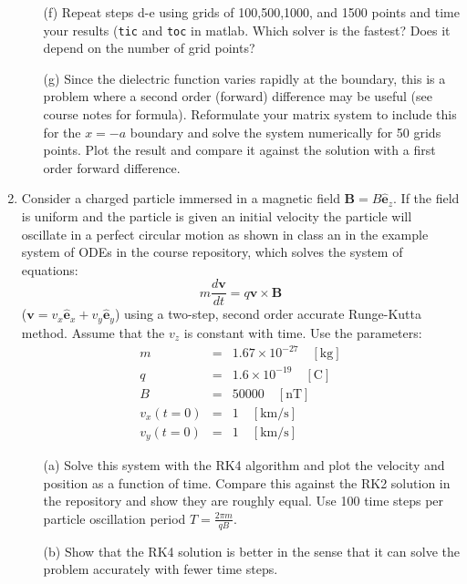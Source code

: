 \documentclass{article}
\begin{document}
\begin{enumerate}
\begin{itemize}
    \item[(f)]  Repeat steps d-e using grids of 100,500,1000, and 1500 points and time your results (\texttt{tic} and \texttt{toc} in matlab.  Which solver is the fastest?  Does it depend on the number of grid points?
    \item[(g)]  Since the dielectric function varies rapidly at the boundary, this is a problem where a second order (forward) difference may be useful (see course notes for formula).  Reformulate your matrix system to include this for the $x=-a$ boundary and solve the system numerically for 50 grids points.  Plot the result and compare it against the solution with a first order forward difference.  
  \end{itemize}
  \item  Consider a charged particle immersed in a magnetic field $\mathbf{B} = B \hat{\mathbf{e}}_z$.  If the field is uniform and the particle is given an initial velocity the particle will oscillate in a perfect circular motion as shown in class an in the example system of ODEs in the course repository, which solves the system of equations:
    \begin{equation}
      m \frac{d \mathbf{v}}{dt} = q \mathbf{v} \times \mathbf{B}
    \end{equation}  
    ($\mathbf{v}=v_x \hat{\mathbf{e}}_x + v_y \hat{\mathbf{e}}_y$) using a two-step, second order accurate Runge-Kutta method.  Assume that the $v_z$ is constant with time.  Use the parameters:  
    \begin{eqnarray}
      m &=& 1.67 \times 10^{-27} \quad \mathrm{[kg]} \\
      q &=& 1.6 \times 10^{-19} \quad \mathrm{[C]} \\
      B &=& 50000 \quad \mathrm{[nT]} \\
      v_x(t=0) &=& 1 \quad \mathrm{[km/s]} \\
      v_y(t=0) &=& 1 \quad \mathrm{[km/s]} 
    \end{eqnarray}
  \begin{itemize}
    \item[(a)]  Solve this system with the RK4 algorithm and plot the velocity and position as a function of time.  Compare this against the RK2 solution in the repository and show they are roughly equal.  Use 100 time steps per particle oscillation period $T=\frac{2 \pi m}{q B}$.  
    \item[(b)]  Show that the RK4 solution is better in the sense that it can solve the problem accurately with fewer time steps.  

\end{itemize}
\end{enumerate}
\end{document}
